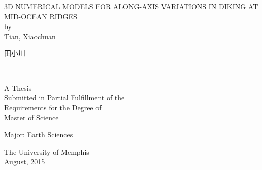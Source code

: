 
\thispagestyle{empty}  %


\begin{center}


\uppercase{3D Numerical Models for Along-axis Variations in Diking at Mid-Ocean Ridges}
\\
\vspace{10pt}
by
\vspace{10pt}
\\
Tian, Xiaochuan
\\
\begin{CJK}{UTF8}{gbsn}
田小川
\end{CJK}
\\
\vspace{100pt}

A Thesis
\\
Submitted in Partial Fulfillment of the 
\\
Requirements for the Degree of 
\\
Master of Science
\\
\vspace{35pt}

Major: Earth Sciences
\\

\vspace{120pt}

The University of Memphis
\\

August, 2015

\end{center}

\restoregeometry
